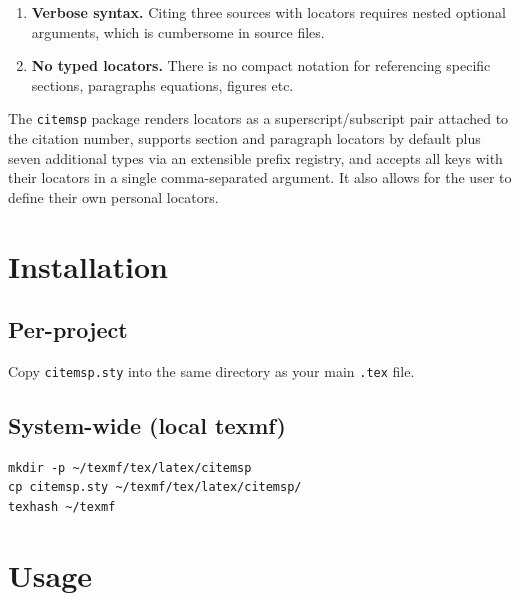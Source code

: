 \documentclass[11pt, a4paper]{article}
\newcommand{\pkg}[1]{\texttt{#1}}
\begin{document}
\begin{enumerate}[leftmargin=2em]
  \item \textbf{Verbose syntax.} Citing three sources with locators requires nested optional arguments, which is cumbersome in source files.
  \item \textbf{No typed locators.} There is no compact notation for referencing specific sections, paragraphs equations, figures etc.
\end{enumerate}

\noindent The \pkg{citemsp} package renders locators as a superscript/subscript pair attached to the citation number, supports section and paragraph locators by default plus seven additional types via an extensible prefix registry, and accepts all keys with their locators in a single comma-separated argument. It also allows for the user to define their own personal locators.


\section{Installation}

\subsection{Per-project}

Copy \texttt{citemsp.sty} into the same directory as your main \texttt{.tex} file.

\subsection{System-wide (local texmf)}

\begin{tcolorbox}[colback=gray!5, colframe=gray!40, boxrule=0.5pt, arc=2pt, top=6pt, bottom=6pt, left=10pt, right=10pt]
\begin{verbatim}
mkdir -p ~/texmf/tex/latex/citemsp
cp citemsp.sty ~/texmf/tex/latex/citemsp/
texhash ~/texmf
\end{verbatim}
\end{tcolorbox}


\section{Usage}
\end{document}
